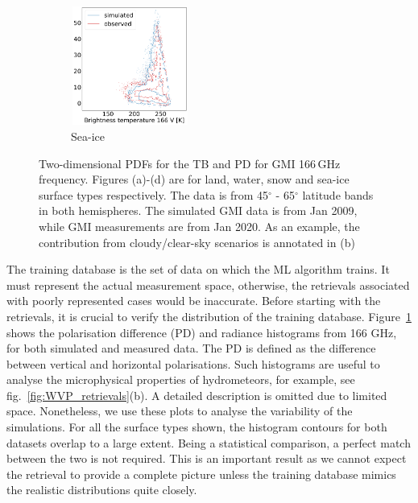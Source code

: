 \documentclass[12pt,oneside,a4paper]{article}
\begin{document}
\begin{figure}[t]
\begin{subfigure}{.24\textwidth}
	\caption{ Sea-ice}
	\includegraphics[height = 39mm, width = 39mm]{Figures/hist2d_gmi_highlat_sea-ice.pdf}
\end{subfigure}
	\caption{Two-dimensional PDFs for the TB and PD for GMI 166\,GHz frequency. Figures (a)-(d) are for land, water, snow and sea-ice surface types respectively. The data is from 45$^\circ$ - 65$^\circ$ latitude bands in both hemispheres. The simulated GMI data is from Jan 2009, while GMI measurements are from Jan 2020. As an example, the contribution from cloudy/clear-sky scenarios is annotated in (b) }
	\label{fig:histogram_2d}
\end{figure}

The training database is the set of data on which the ML algorithm trains. It must represent the actual measurement space, otherwise, the retrievals associated with poorly represented cases would be inaccurate. Before starting with the retrievals, it is crucial to verify the distribution of the training database. Figure~\ref{fig:histogram_2d} shows the polarisation difference (PD) and radiance histograms from 166 GHz, for both simulated and measured data. The PD is defined as the difference between vertical and horizontal polarisations. Such histograms are useful to analyse the microphysical properties of hydrometeors, for example, see fig.~\ref{fig:WVP_retrievals}(b). A detailed description is omitted due to limited space. Nonetheless, we use these plots to analyse the variability of the simulations. For all the surface types shown, the histogram contours for both datasets overlap to a large extent. Being a statistical comparison, a perfect match between the two is not required. This is an important result as we cannot expect the retrieval to provide a complete picture unless the training database mimics the realistic distributions quite closely.
\end{document}
